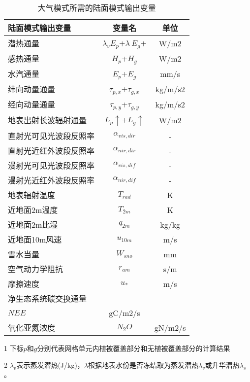 \begin{table}[]
\centering
\caption{大气模式所需的陆面模式输出变量}
\label{tab:大气模式所需的陆面模式输出变量}
\begin{threeparttable}
\begin{tabular}{lcc}
\toprule
陆面模式输出变量    & 变量名                            & 单位      \\ \midrule
潜热通量        & $\lambda_vE_p$+$\lambda\ E_g$+ & W/m2    \\
感热通量        & $H_p$+$H_g$                    & W/m2    \\
水汽通量        & $E_p$+$E_g$                    & mm/s    \\
纬向动量通量      & $\tau_{p,x}$+$\tau_{g,x}$      & kg/m/s2 \\
经向动量通量      & $\tau_{p,y}$+$\tau_{g,y}$      & kg/m/s2 \\
地表出射长波辐射通量  & $L_p\uparrow$+$L_g\uparrow$    & W/m2    \\
直射光可见光波段反照率 & $\alpha_{vis,dir}$             & -       \\
直射光近红外波段反照率 & $\alpha_{nir,dir}$             & -       \\
漫射光可见光波段反照率 & $\alpha_{vis,dif}$             & -       \\
漫射光近红外波段反照率 & $\alpha_{nir,dif}$             & -       \\
地表辐射温度      & $T_{rad}$                      & K       \\
近地面2m温度     & $T_{2m}$                       & K       \\
近地面2m比湿     & $q_{2m}$                       & kg/kg   \\
近地面10m风速    & $u_{10m}$                      & m/s     \\
雪水当量        & $W_{sno}$                      & mm      \\
空气动力学阻抗     & $r_{am}$                       & s/m     \\
摩擦速度        & $u_\ast$                       & m/s     \\
净生态系统碳交换通量  &                                &         \\
$NEE$       & gC/m2/s                        &         \\
氧化亚氮浓度      & $N_2O$                         & gN/m2/s\\\bottomrule
         
\end{tabular}
\begin{tablenotes}
\footnotesize
\item[1] 下标$p$和$g$分别代表网格单元内植被覆盖部分和无植被覆盖部分的计算结果
\item[2] $\lambda_v$表示蒸发潜热(J/kg)，$\lambda$根据地表水份是否冻结取为蒸发潜热$\lambda_v$或升华潜热$\lambda_s$。
\end{tablenotes}
\end{threeparttable}
\end{table}

